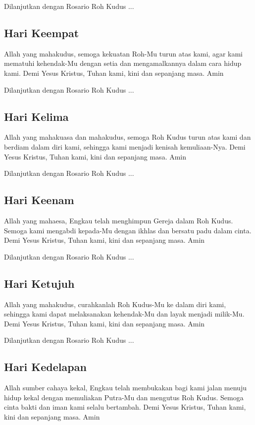 Dilanjutkan dengan Rosario Roh Kudus ...

\subsection*{Hari Keempat}
Allah yang mahakudus, semoga kekuatan Roh-Mu turun atas kami, agar kami
mematuhi kehendak-Mu dengan setia dan mengamalkannya dalam cara hidup
kami. Demi Yesus Kristus, Tuhan kami, kini dan sepanjang masa. Amin

Dilanjutkan dengan Rosario Roh Kudus ...

\subsection*{Hari Kelima}
Allah yang mahakuasa dan mahakudus, semoga Roh Kudus turun atas kami dan
berdiam dalam diri kami, sehingga kami menjadi kenisah kemuliaan-Nya.
Demi Yesus Kristus, Tuhan kami, kini dan sepanjang masa. Amin

Dilanjutkan dengan Rosario Roh Kudus ...

\subsection*{Hari Keenam}
Allah yang mahaesa, Engkau telah menghimpun Gereja dalam Roh Kudus.
Semoga kami mengabdi kepada-Mu dengan ikhlas dan bersatu padu dalam
cinta. Demi Yesus Kristus, Tuhan kami, kini dan sepanjang masa. Amin

Dilanjutkan dengan Rosario Roh Kudus ...

\subsection*{Hari Ketujuh}
Allah yang mahakudus, curahkanlah Roh Kudus-Mu ke dalam diri kami,
sehingga kami dapat melaksanakan kehendak-Mu dan layak menjadi
milik-Mu. Demi Yesus Kristus, Tuhan kami, kini dan sepanjang masa. Amin

Dilanjutkan dengan Rosario Roh Kudus ...

\subsection*{Hari Kedelapan}
Allah sumber cahaya kekal, Engkau telah membukakan bagi kami jalan
menuju hidup kekal dengan memuliakan Putra-Mu dan mengutus Roh Kudus.
Semoga cinta bakti dan iman kami selalu bertambah. Demi Yesus Kristus,
Tuhan kami, kini dan sepanjang masa. Amin

